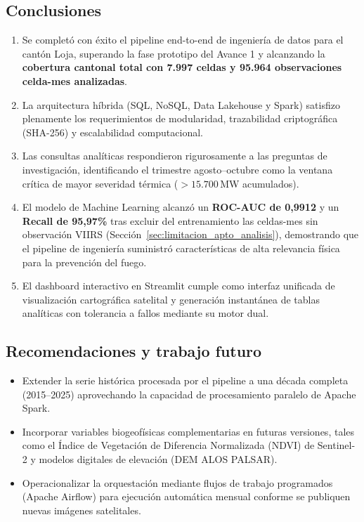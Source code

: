 \documentclass[11pt,a4paper]{article}
\begin{document}
\subsection{Conclusiones}
\begin{enumerate}
    \item Se complet\'o con \'exito el pipeline end-to-end de ingenier\'ia de datos para el cant\'on Loja, superando la fase prototipo del Avance 1 y alcanzando la \textbf{cobertura cantonal total con 7.997 celdas y 95.964 observaciones celda-mes analizadas}.
    \item La arquitectura h\'ibrida (SQL, NoSQL, Data Lakehouse y Spark) satisfizo plenamente los requerimientos de modularidad, trazabilidad criptogr\'afica (SHA-256) y escalabilidad computacional.
    \item Las consultas anal\'iticas respondieron rigurosamente a las preguntas de investigaci\'on, identificando el trimestre agosto--octubre como la ventana cr\'itica de mayor severidad t\'ermica ($>15.700$\,MW acumulados).
    \item El modelo de Machine Learning alcanz\'o un \textbf{ROC-AUC de 0,9912} y un \textbf{Recall de 95,97\%} tras excluir del entrenamiento las celdas-mes sin observaci\'on VIIRS (Secci\'on~\ref{sec:limitacion_apto_analisis}), demostrando que el pipeline de ingenier\'ia suministr\'o caracter\'isticas de alta relevancia f\'isica para la prevenci\'on del fuego.
    \item El dashboard interactivo en Streamlit cumple como interfaz unificada de visualizaci\'on cartogr\'afica satelital y generaci\'on instant\'anea de tablas anal\'iticas con tolerancia a fallos mediante su motor dual.
\end{enumerate}

\subsection{Recomendaciones y trabajo futuro}
\label{sec:recomendaciones}
\begin{itemize}
    \item Extender la serie hist\'orica procesada por el pipeline a una d\'ecada completa (2015--2025) aprovechando la capacidad de procesamiento paralelo de Apache Spark.
    \item Incorporar variables biogeof\'isicas complementarias en futuras versiones, tales como el \'Indice de Vegetaci\'on de Diferencia Normalizada (NDVI) de Sentinel-2 y modelos digitales de elevaci\'on (DEM ALOS PALSAR).
    \item Operacionalizar la orquestaci\'on mediante flujos de trabajo programados (Apache Airflow) para ejecuci\'on autom\'atica mensual conforme se publiquen nuevas im\'agenes satelitales.
\end{itemize}
\end{document}
